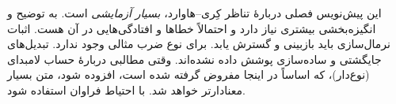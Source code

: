 \documentclass[../../../include/open-logic-chapter]{subfiles}
\begin{document}

\begin{editorial}
  این پیش‌نویس فصلی دربارهٔ تناظر کِری--هاوارد، \emph{بسیار آزمایشی}
  است. به توضیح و انگیزه‌بخشی بیشتری نیاز دارد و احتمالاً خطاها و
  افتادگی‌هایی در آن هست. اثبات نرمال‌سازی باید بازبینی و گسترش یابد.
  برای نوع ضرب مثالی وجود ندارد. تبدیل‌های جایگشتی و ساده‌سازی پوشش
  داده نشده‌اند. وقتی مطالبی دربارهٔ حساب لامبدای (نوع‌دار)، که اساساً
  در اینجا مفروض گرفته شده است، افزوده شود، متن بسیار معنادارتر خواهد
  شد. با احتیاط فراوان استفاده شود.
\end{editorial}


\OLEndChapterHook
\end{document}
